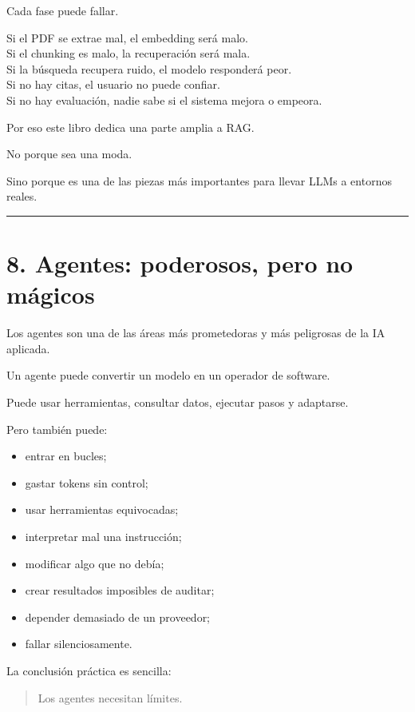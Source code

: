 Cada fase puede fallar.

Si el PDF se extrae mal, el embedding será malo.\\
Si el chunking es malo, la recuperación será mala.\\
Si la búsqueda recupera ruido, el modelo responderá peor.\\
Si no hay citas, el usuario no puede confiar.\\
Si no hay evaluación, nadie sabe si el sistema mejora o empeora.

Por eso este libro dedica una parte amplia a RAG.

No porque sea una moda.

Sino porque es una de las piezas más importantes para llevar LLMs a
entornos reales.

\begin{center}\rule{0.5\linewidth}{0.5pt}\end{center}

\section{8. Agentes: poderosos, pero no
mágicos}\label{agentes-poderosos-pero-no-muxe1gicos}

Los agentes son una de las áreas más prometedoras y más peligrosas de la
IA aplicada.

Un agente puede convertir un modelo en un operador de software.

Puede usar herramientas, consultar datos, ejecutar pasos y adaptarse.

Pero también puede:

\begin{itemize}
\tightlist
\item
  entrar en bucles;
\item
  gastar tokens sin control;
\item
  usar herramientas equivocadas;
\item
  interpretar mal una instrucción;
\item
  modificar algo que no debía;
\item
  crear resultados imposibles de auditar;
\item
  depender demasiado de un proveedor;
\item
  fallar silenciosamente.
\end{itemize}

La conclusión práctica es sencilla:

\begin{quote}
Los agentes necesitan límites.
\end{quote}

